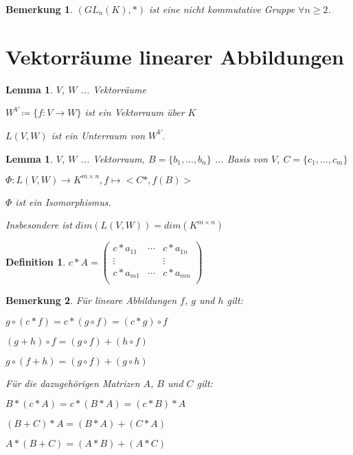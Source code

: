 \documentclass[twocolumn]{article}
\newtheorem{lemma}[theorem]{Lemma}
\newtheorem{definition}{Definition}[section]
\newtheorem*{remark}{Bemerkung}
\begin{document}
\begin{remark}
	$(GL_n(K),*)$ ist eine nicht kommutative Gruppe $\forall n \geq 2$.
\end{remark}

\section{Vektorräume linearer Abbildungen}

\begin{lemma}
	$V$, $W$ ... Vektorräume
	
	$W^V\coloneqq \{f : V \rightarrow W\}$ ist ein Vektorraum über $K$
	
	$L(V,W)$ ist ein Unterraum von $W^V$.
\end{lemma}

\begin{lemma}
	$V$, $W$ ... Vektorraum, $B=\{b_1,...,b_n\}$ ... Basis von $V$, $C=\{c_1,...,c_m\}$
	
	$\Phi : L(V,W)\rightarrow K^{m\times n}, f \mapsto <C*,f(B)>$
	
	$\Phi$ ist ein Isomorphismus.
	
	Insbesondere ist $dim(L(V,W)) = dim(K^{m \times n})$
\end{lemma}

\begin{definition}
	$c*A=\begin{pmatrix}
		c*a_{11} & \cdots & c*a_{1n} \\
		\vdots &  & \vdots \\
		c*a_{m1} & \cdots & c*a_{mn} \\
	\end{pmatrix}$
\end{definition}

\begin{remark}
	
	Für lineare Abbildungen $f$, $g$ und $h$ gilt:
	
	$g \circ (c*f) = c*(g \circ f) = (c*g) \circ f$
	
	$(g+h)\circ f = (g \circ f) + (h \circ f)$
	
	$g \circ (f+h) = (g \circ f) + (g \circ h)$
	
	Für die dazugehörigen Matrizen $A$, $B$ und $C$ gilt:
	
	$B*(c*A) = c*(B*A) = (c*B) * A$
	
	$(B+C)*A = (B*A)+(C*A)$
	
	$A*(B+C) = (A*B) + (A*C)$
\end{remark}
\end{document}
